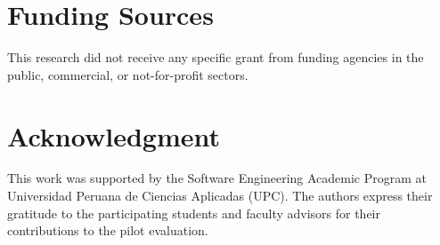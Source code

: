 \documentclass[a4paper,fleqn]{cas-dc}
\begin{document}
\section*{Funding Sources}
This research did not receive any specific grant from funding agencies in the public, commercial, or not-for-profit sectors.

\section*{Acknowledgment}
This work was supported by the Software Engineering Academic Program at Universidad Peruana de Ciencias Aplicadas (UPC). The authors express their gratitude to the participating students and faculty advisors for their contributions to the pilot evaluation.



\end{document}
